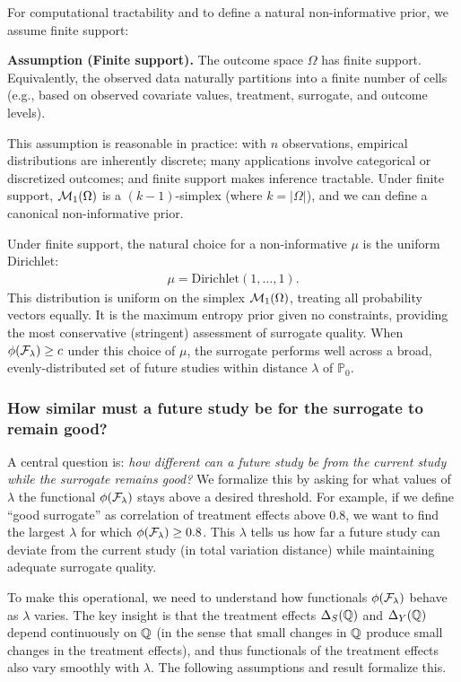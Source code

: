 \documentclass{article}
\newcommand{\PP}{\mathbb{P}}
\begin{document}
For computational tractability and to define a natural non-informative prior, we assume finite support:

\noindent\textbf{Assumption (Finite support).}\label{ass:finite}
The outcome space $\Omega$ has finite support. Equivalently, the observed data naturally partitions into a finite number of cells (e.g., based on observed covariate values, treatment, surrogate, and outcome levels).

This assumption is reasonable in practice: with $n$ observations, empirical distributions are inherently discrete; many applications involve categorical or discretized outcomes; and finite support makes inference tractable. Under finite support, $\mathcal{M}_1(\Omega)$ is a $(k-1)$-simplex (where $k = |\Omega|$), and we can define a canonical non-informative prior.

Under finite support, the natural choice for a non-informative $\mu$ is the uniform Dirichlet:
\begin{align}
    \mu = \text{Dirichlet}(1, \ldots, 1).
\end{align}
This distribution is uniform on the simplex $\mathcal{M}_1(\Omega)$, treating all probability vectors equally. It is the maximum entropy prior given no constraints, providing the most conservative (stringent) assessment of surrogate quality. When $\phi(\mathcal{F}_\lambda) \geq c$ under this choice of $\mu$, the surrogate performs well across a broad, evenly-distributed set of future studies within distance $\lambda$ of $\PP_0$.

\subsubsection{How similar must a future study be for the surrogate to remain good?}

A central question is: \emph{how different can a future study be from the current study while the surrogate remains good?} We formalize this by asking for what values of $\lambda$ the functional $\phi(\mathcal{F}_\lambda)$ stays above a desired threshold. For example, if we define ``good surrogate'' as correlation of treatment effects above 0.8, we want to find the largest $\lambda$ for which $\phi(\mathcal{F}_\lambda) \geq 0.8$. This $\lambda$ tells us how far a future study can deviate from the current study (in total variation distance) while maintaining adequate surrogate quality.

To make this operational, we need to understand how functionals $\phi(\mathcal{F}_\lambda)$ behave as $\lambda$ varies. The key insight is that the treatment effects $\Delta_S(\mathbb{Q})$ and $\Delta_Y(\mathbb{Q})$ depend continuously on $\mathbb{Q}$ (in the sense that small changes in $\mathbb{Q}$ produce small changes in the treatment effects), and thus functionals of the treatment effects also vary smoothly with $\lambda$. The following assumptions and result formalize this.
\end{document}
